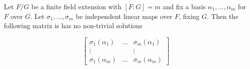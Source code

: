 \begin{lemma}\label{charindlem}
Let $F/G$ be a finite field extension with $[F:G] = m$ and fix a basis $\alpha_1, \ldots, \alpha_m$ for $F$ over $G$. Let $\sigma_1, \ldots, \sigma_m$ be independent linear maps over $F$, fixing $G$. Then the following matrix is has no non-trivial solutions

\begin{equation*}
 \begin{bmatrix}
\sigma_1(\alpha_1) & \ldots & \sigma_m(\alpha_1) \\ \vdots & & \vdots \\ \sigma_1(\alpha_m) & \ldots & \sigma_m(\alpha_m) 
\end{bmatrix}   
\end{equation*}


\end{lemma}
